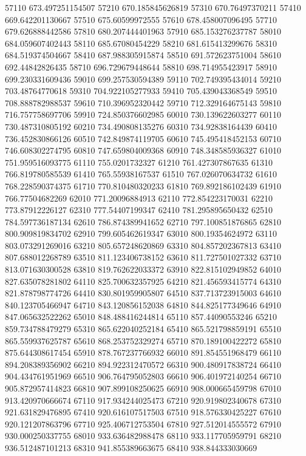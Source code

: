 {57110 673.497251154507
57210 670.185845626819
57310 670.76497370211
57410 669.642201130667
57510 675.60599972555
57610 678.458007096495
57710 679.626888442586
57810 680.207444401963
57910 685.153276237787
58010 684.059607402443
58110 685.67080454229
58210 681.615413299676
58310 684.519374504667
58410 687.988305915874
58510 691.572623751004
58610 692.44842826435
58710 696.729679448644
58810 698.714955423917
58910 699.230331609436
59010 699.257530594389
59110 702.749395434014
59210 703.48764770618
59310 704.922105277933
59410 705.439043368549
59510 708.888782988537
59610 710.396952320442
59710 712.329164675143
59810 716.757758697706
59910 724.850376602985
60010 730.139622603277
60110 730.487310805192
60210 734.490808135276
60310 734.92838164439
60410 736.452830866126
60510 742.849874119705
60610 745.495418452153
60710 746.608302274795
60810 747.659804009368
60910 748.348585936327
61010 751.959516093775
61110 755.0201732327
61210 761.427307867635
61310 766.819780585539
61410 765.55938167537
61510 767.026070634732
61610 768.228590374375
61710 770.810480320233
61810 769.892186102439
61910 766.77504682269
62010 771.20096884913
62110 772.854223170031
62210 773.87912226127
62310 777.54407199347
62410 781.295895650432
62510 784.597736187134
62610 786.874389941652
62710 797.100851876865
62810 800.909819834702
62910 799.605462619347
63010 800.19354624972
63110 803.073291269016
63210 805.657248620869
63310 804.857202367813
63410 807.688012268789
63510 811.123406738152
63610 811.727501027332
63710 813.071630300528
63810 819.762622033372
63910 822.815102949852
64010 827.635078281802
64110 825.700632357925
64210 821.456593415774
64310 821.878798774726
64410 830.801959905807
64510 837.713723915003
64610 840.123705466947
64710 843.120856152038
64810 844.825177349646
64910 847.065632522262
65010 848.488416244814
65110 857.44090553246
65210 859.734788479279
65310 865.622040252184
65410 865.521798859191
65510 865.559937625787
65610 868.253752329274
65710 870.189100422272
65810 875.644308617454
65910 878.767237766932
66010 891.854551968479
66110 894.208389356902
66210 894.922312470572
66310 900.480917838724
66410 904.434761951969
66510 906.764795052803
66610 906.401972140254
66710 905.872957414823
66810 907.899108250625
66910 908.000665459798
67010 913.420970666674
67110 917.934244025473
67210 920.919802340678
67310 921.631829476895
67410 920.616107517503
67510 918.576330425227
67610 920.121207863796
67710 925.406712753504
67810 927.512014555572
67910 930.000250337755
68010 933.636482988478
68110 933.117705959791
68210 936.512487101213
68310 941.855389663675
68410 938.844333030669
}
